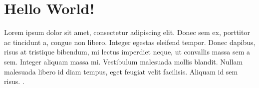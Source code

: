 \documentclass{article}
\begin{document}
\section{Hello World!}

Lorem ipsum dolor sit amet, consectetur adipiscing elit. Donec sem ex, porttitor ac tincidunt a, congue non libero. Integer egestas eleifend tempor. Donec dapibus, risus at tristique bibendum, mi lectus imperdiet neque, ut convallis massa sem a sem. Integer aliquam massa mi. Vestibulum malesuada mollis blandit. Nullam malesuada libero id diam tempus, eget feugiat velit facilisis. Aliquam id sem risus. \cite{dude2022stuff}.

\begin{figure}
    
\end{figure}





\end{document}
